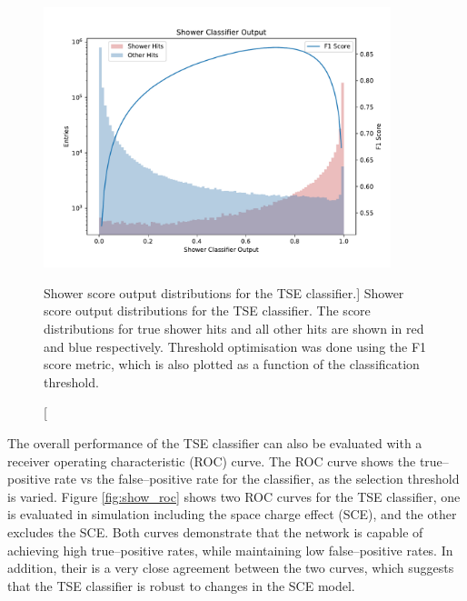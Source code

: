 \begin{figure}
	\centering
	\includegraphics[width=0.9\textwidth]{figures/shower_combined.pdf} 
	\caption
	[Shower score output distributions for the TSE classifier.]
	{Shower score output distributions for the TSE classifier. The score
	distributions for true shower hits and all other hits are shown in red and
	blue respectively. Threshold optimisation was done using the F1 score metric, 
	which is also plotted as a function of the classification threshold.}
	\label{fig:show_output}
\end{figure}

The overall performance of the TSE classifier can also be evaluated with a
receiver operating characteristic (ROC) curve\cite{Fawcett2006}. The ROC curve
shows the true--positive rate vs the false--positive rate for the classifier, as
the selection threshold is varied. Figure \ref{fig:show_roc} shows two ROC
curves for the TSE classifier, one is evaluated in simulation including
the space charge effect (SCE), and the other excludes the SCE. Both curves
demonstrate that the network is capable of achieving high true--positive rates,
while maintaining low false--positive rates. In addition, their is a very close
agreement between the two curves, which suggests that the TSE classifier is
robust to changes in the SCE model.

